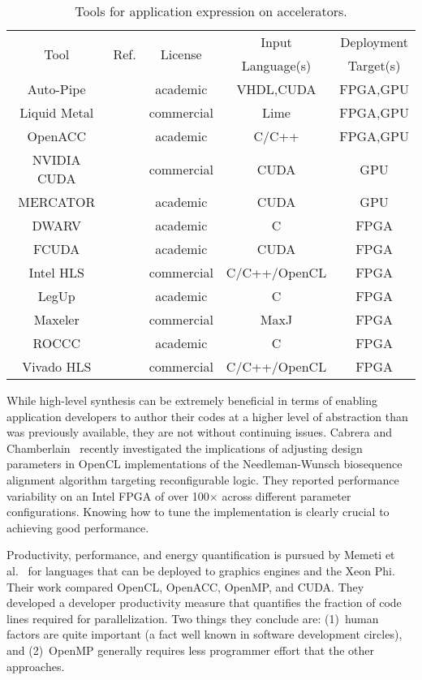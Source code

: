\begin{table}[ht]
\centering
\caption{Tools for application expression on accelerators.}
\label{tbl:tools}
\vspace{0.1in} 
\begin{tabular}{c | c | c | c | c }
\multirow{2}{*}{Tool} & \multirow{2}{*}{Ref.} & \multirow{2}{*}{License} & Input & Deployment \\
  &   &   & Language(s) & Target(s)\\ \hline
Auto-Pipe & \cite{cft+10} & academic & VHDL,CUDA & FPGA,GPU \\ \hline
Liquid Metal  & \cite{abb+12} & commercial & Lime & FPGA,GPU \\ \hline
OpenACC & \cite{lkv16} & academic & C/C++ & FPGA,GPU \\ \hline
NVIDIA CUDA  & \cite{gems} & commercial & CUDA & GPU \\ \hline
MERCATOR & \cite{cb17} & academic & CUDA & GPU \\ \hline
DWARV & \cite{nso+12} & academic & C & FPGA \\ \hline
FCUDA & \cite{pgs+13} & academic & CUDA & FPGA \\ \hline
Intel HLS & & commercial & C/C++/OpenCL & FPGA \\ \hline
LegUp & \cite{cca+13} & academic & C & FPGA \\ \hline
Maxeler & \cite{maxj} & commercial & MaxJ & FPGA \\ \hline
ROCCC & \cite{vpnh10} & academic & C & FPGA \\ \hline
Vivado HLS & & commercial & C/C++/OpenCL & FPGA \\
\end{tabular}
\end{table}


While high-level synthesis can be extremely beneficial in terms of
enabling application developers to author their codes at a higher level
of abstraction than was previously available, they are not without 
continuing issues.  Cabrera and Chamberlain~\cite{cc19} recently
investigated the implications of adjusting design parameters in OpenCL 
implementations of the Needleman-Wunsch biosequence alignment algorithm
targeting reconfigurable logic.
They reported performance variability on an Intel FPGA of over 100$\times$
across different parameter configurations.
Knowing how to tune the implementation is clearly crucial to achieving
good performance.

Productivity, performance, and energy quantification is pursued
by Memeti et al.~\cite{mlp+17} for languages that can be deployed
to graphics engines and the Xeon Phi. Their work compared OpenCL,
OpenACC, OpenMP, and CUDA. They developed a developer productivity measure 
that quantifies the fraction of code lines required for parallelization.
Two things they conclude are: (1)~human factors are quite important
(a fact well known in software development circles), and (2)~OpenMP
generally requires less programmer effort that the other approaches.

